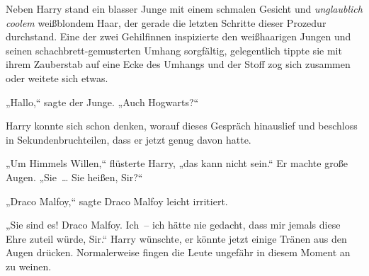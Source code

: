 Neben Harry stand ein blasser Junge mit einem schmalen Gesicht und \emph{unglaublich coolem} weißblondem Haar, der gerade die letzten Schritte dieser Prozedur durchstand. Eine der zwei Gehilfinnen inspizierte den weißhaarigen Jungen und seinen schachbrett-gemusterten Umhang sorgfältig, gelegentlich tippte sie mit ihrem Zauberstab auf eine Ecke des Umhangs und der Stoff zog sich zusammen oder weitete sich etwas.

„Hallo,“ sagte der Junge. „Auch Hogwarts?“

Harry konnte sich schon denken, worauf dieses Gespräch hinauslief und beschloss in Sekundenbruchteilen, dass er jetzt genug davon hatte.

„Um Himmels Willen,“ flüsterte Harry, „das kann nicht sein.“ Er machte große Augen. „Sie … Sie heißen, Sir?“

„Draco Malfoy,“ sagte Draco Malfoy leicht irritiert.

„Sie sind es! Draco Malfoy. Ich – ich hätte nie gedacht, dass mir jemals diese Ehre zuteil würde, Sir.“ Harry wünschte, er könnte jetzt einige Tränen aus den Augen drücken. Normalerweise fingen die Leute ungefähr in diesem Moment an zu weinen.

